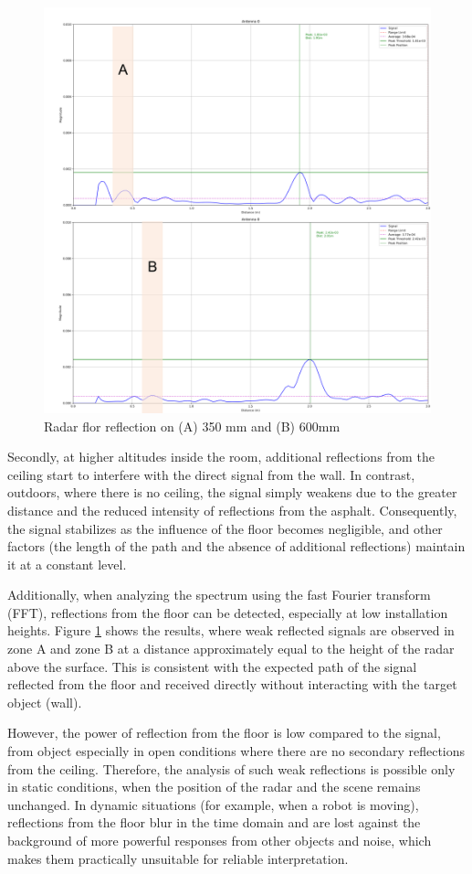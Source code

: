\begin{figure}[H]
    \centering
    \includegraphics[width=0.7\linewidth]{Src//images/radarreflectionflor2.png}
    \caption{Radar flor reflection on (A) 350 mm and (B) 600mm}
    \label{fig:reflection-flor}
\end{figure}
Secondly, at higher altitudes inside the room, additional reflections from the ceiling start to interfere with the direct signal from the wall. 
In contrast, outdoors, where there is no ceiling, the signal simply weakens due to the greater distance and the reduced intensity of reflections from the asphalt. Consequently, the signal stabilizes as the influence of the floor becomes negligible, and other factors (the length of the path and the absence of additional reflections) maintain it at a constant level.

Additionally, when analyzing the spectrum using the fast Fourier transform (FFT), reflections from the floor can be detected, especially at low installation heights. Figure  \ref{fig:reflection-flor} shows the results, where weak reflected signals are observed in zone A and zone B at a distance approximately equal to the height of the radar above the surface. This is consistent with the expected path of the signal reflected from the floor and received directly without interacting with the target object (wall).

However, the power of reflection from the floor is low compared to the signal, from object especially in open conditions where there are no secondary reflections from the ceiling. Therefore, the analysis of such weak reflections is possible only in static conditions, when the position of the radar and the scene remains unchanged. In dynamic situations (for example, when a robot is moving), reflections from the floor blur in the time domain and are lost against the background of more powerful responses from other objects and noise, which makes them practically unsuitable for reliable interpretation.






